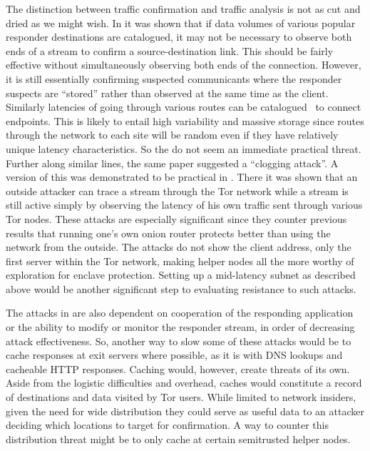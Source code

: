 \documentclass{llncs}
\begin{document}
The distinction between traffic confirmation and traffic analysis is
not as cut and dried as we might wish. In \cite{hintz-pet02} it was
shown that if data volumes of various popular
responder destinations are catalogued, it may not be necessary to
observe both ends of a stream to confirm a source-destination link.
This should be fairly effective without simultaneously observing both
ends of the connection. However, it is still essentially confirming
suspected communicants where the responder suspects are ``stored'' rather
than observed at the same time as the client.
Similarly latencies of going through various routes can be
catalogued~\cite{back01} to connect endpoints.
This is likely to entail high variability and massive storage since
%
routes through the network to each site will be random even if they
have relatively unique latency characteristics. So the do
not seem an immediate practical threat. Further along similar lines,
the same paper suggested a ``clogging attack''. A version of this
was demonstrated to be practical in
\cite{attack-tor-oak05}. There it was shown that an outside attacker can
trace a stream through the Tor network while a stream is still active
simply by observing the latency of his own traffic sent through
various Tor nodes. These attacks are especially significant since they
counter previous results that running one's own onion router protects
better than using the network from the outside. The attacks do not
show the client address, only the first server within the Tor network,
making helper nodes all the more worthy of exploration for enclave
protection. Setting up a mid-latency subnet as described above would
be another significant step to evaluating resistance to such attacks.

The attacks in \cite{attack-tor-oak05} are also dependent on
cooperation of the responding application or the ability to modify or
monitor the responder stream, in order of decreasing attack
effectiveness.  So, another way to slow some of these attacks
would be to cache responses at exit servers where possible, as it is with
DNS lookups and cacheable HTTP responses.  Caching would, however,
create threats of its own.
Aside from the logistic
difficulties and overhead, caches would  constitute a
record of destinations and data visited by Tor users.  While
limited to network insiders, given the need for wide distribution
they could serve as useful data to an attacker deciding which locations
to target for confirmation. A way to counter this distribution
threat might be to only cache at certain semitrusted helper nodes.
\end{document}

